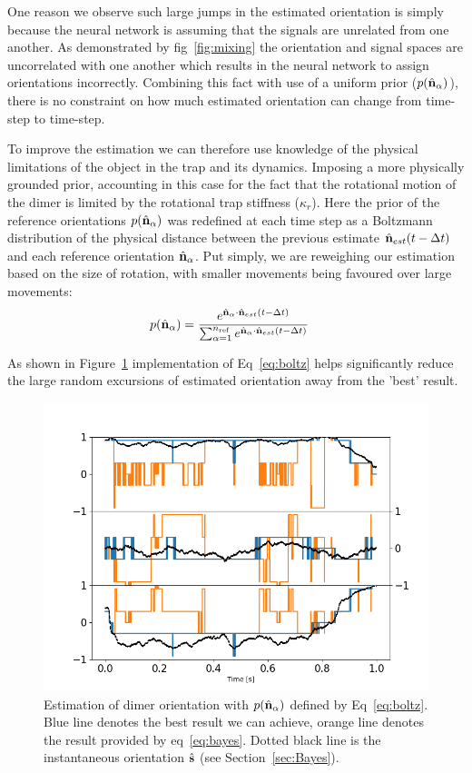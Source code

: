 One reason we observe such large jumps in the estimated 
orientation is simply because the neural network is assuming
that the signals are unrelated from one another. As demonstrated
by fig~\ref{fig:mixing} the orientation and signal spaces are 
uncorrelated with one another which results in the neural network
to assign orientations incorrectly. Combining this fact with 
use of a uniform prior ($p(\hat{\bf n}_\alpha)$), there 
is no constraint on how much estimated orientation can change 
from time-step to time-step. 

To improve the estimation we can therefore use knowledge of the 
physical limitations of the object in the trap and its dynamics. 
Imposing a more physically grounded prior, accounting in this case 
for the fact that the rotational motion of the dimer is limited by 
the rotational trap stiffness ($\kappa_r$). Here the prior of the 
reference orientations $p(\hat{\bf n}_\alpha)$ was redefined at 
each time step as a Boltzmann distribution of the physical distance 
between the previous estimate $\hat{\bf n}_{est}(t-\Delta t)$ and 
each reference orientation $\hat{\bf n}_\alpha$. Put simply, we are 
reweighing our estimation based on the size of rotation, with smaller movements being favoured over large movements:
\begin{align}
	p(\hat{\bf n}_\alpha)
	&=\frac{e^{\hat{\bf n}_\alpha 
			\cdot \hat{\bf n}_{est}(t-\Delta t)}}
	{\sum_{\alpha=1}^{n_{\rm ref}}
		e^{\hat{\bf n}_\alpha 
			\cdot \hat{\bf n}_{est}(t-\Delta t)}}
	\label{eq:boltz}
\end{align}

As shown in Figure~\ref{fig:biased} implementation of Eq~\eqref{eq:boltz} helps significantly reduce the large random excursions of estimated orientation away from the 'best' result. 

\begin{figure}[h]
	\centering
	\includegraphics[width=\textwidth]{fig8a.png}
	\caption{\label{fig:biased}
		Estimation of dimer orientation with $p(\hat{\bf n}_\alpha)$ defined
		by Eq~\eqref{eq:boltz}.  Blue line denotes the best result we can
		achieve, orange line denotes the result provided by eq~\ref{eq:bayes}.
		Dotted black line is the instantaneous orientation $\hat{\bf s}$ (see Section~\ref{sec:Bayes}).
	}
\end{figure} 

